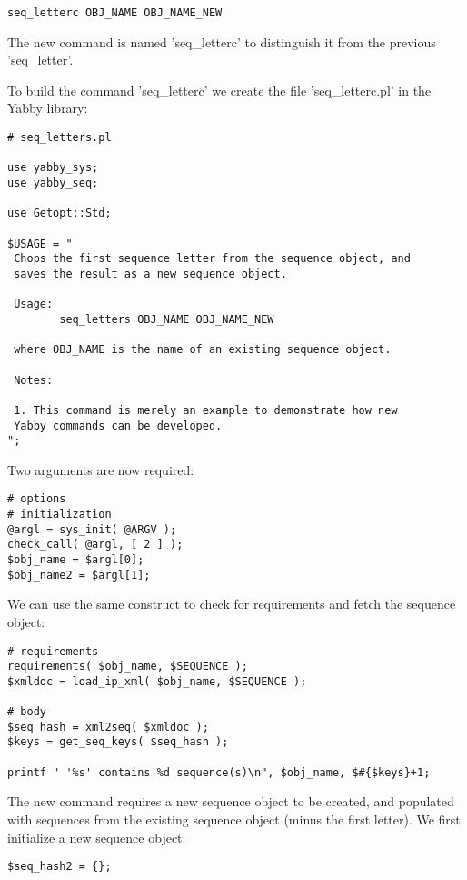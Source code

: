 \begin{verbatim}
seq_letterc OBJ_NAME OBJ_NAME_NEW
\end{verbatim}

The new command is named 'seq\_letterc' to distinguish it from
the previous 'seq\_letter'.

To build the command 'seq\_letterc' we create the file 'seq\_letterc.pl'
in the Yabby library:

\begin{verbatim}
# seq_letters.pl

use yabby_sys;
use yabby_seq;

use Getopt::Std;

$USAGE = "
 Chops the first sequence letter from the sequence object, and
 saves the result as a new sequence object.

 Usage:
        seq_letters OBJ_NAME OBJ_NAME_NEW

 where OBJ_NAME is the name of an existing sequence object.

 Notes:

 1. This command is merely an example to demonstrate how new
 Yabby commands can be developed.
";
\end{verbatim}

Two arguments are now required:

\begin{verbatim}
# options
# initialization
@argl = sys_init( @ARGV );
check_call( @argl, [ 2 ] );
$obj_name = $argl[0];
$obj_name2 = $argl[1];
\end{verbatim}

We can use the same construct to check for requirements and fetch the
sequence object:

\begin{verbatim}
# requirements
requirements( $obj_name, $SEQUENCE );
$xmldoc = load_ip_xml( $obj_name, $SEQUENCE );

# body
$seq_hash = xml2seq( $xmldoc );
$keys = get_seq_keys( $seq_hash );

printf " '%s' contains %d sequence(s)\n", $obj_name, $#{$keys}+1;
\end{verbatim}

The new command requires a new sequence object to be created, and
populated with sequences from the existing sequence object (minus
the first letter). We first initialize a new sequence object:

\begin{verbatim}
$seq_hash2 = {};
\end{verbatim}


